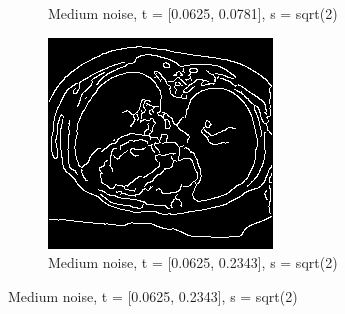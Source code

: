 \begin{figure}[H]
\begin{subfigure}{.5\textwidth}
    \caption{Medium noise, t = [0.0625, 0.0781], s = sqrt(2)}
    \label{fig:m_noise_sens_h_thres}
  \end{subfigure}%
  \begin{subfigure}{.5\textwidth}
    \centering
    \includegraphics[width=.9\textwidth]{./edgedetection/medium_noise/m_noise_insens_h_thres}
    \caption{Medium noise, t = [0.0625, 0.2343], s = sqrt(2)}
    \label{fig:m_noise_insens_h_thres}
  \end{subfigure}%
  
\end{figure}

